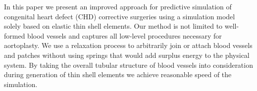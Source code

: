 In this paper we present an improved approach for predictive simulation of congenital heart defect (CHD) corrective surgeries using a simulation model solely based on elastic thin shell elements. Our method is not limited to well-formed blood vessels and captures all low-level procedures necessary for aortoplasty. We use a relaxation process to arbitrarily join or attach blood vessels and patches without using springs that would add surplus energy to the physical system. By taking the overall tubular structure of blood vessels into consideration during generation of thin shell elements we achieve reasonable speed of the simulation.


